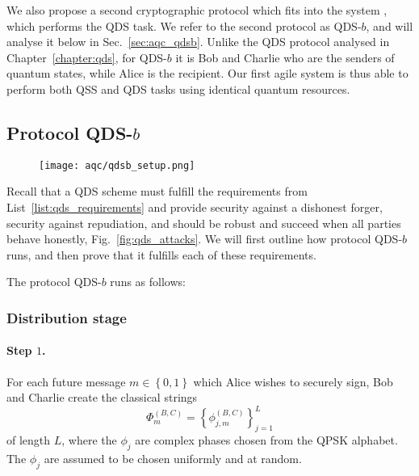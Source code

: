We also propose a second cryptographic protocol which fits into the system \systemB, which performs the QDS task. We refer to the second protocol as QDS-$b$, and will analyse it below in Sec.~\ref{sec:aqc_qdsb}. Unlike the QDS protocol analysed in Chapter~\ref{chapter:qds}, for QDS-$b$ it is Bob and Charlie who are the senders of quantum states, while Alice is the recipient. %
Our first agile system \systemB \; is thus able to perform both QSS and QDS tasks using identical quantum resources. %

\subsection{Protocol QDS-$b$}


\begin{figure}[htp]
\centering
\texttt{[image: aqc/qdsb\_setup.png]}
\caption{\label{fig:qdsb_setup} }
\end{figure}

Recall that a QDS scheme must fulfill the requirements from List~\ref{list:qds_requirements} and provide security against a dishonest forger, security against repudiation, and should be robust and succeed when all parties behave honestly, Fig.~\ref{fig:qds_attacks}. We will first outline how protocol QDS-$b$ runs, and then prove that it fulfills each of these requirements.

The protocol QDS-$b$ runs as follows:

\subsubsection*{Distribution stage}

\paragraph{Step $1$.}
For each future message $m \in \left\{0, 1\right\}$ which Alice wishes to securely sign, Bob and Charlie create the classical strings
\begin{equation}
\Phi_m^{\left(B, C\right)} = \left\{\phi_{j, m}^{\left(B, C\right)}\right\}_{j=1}^L
\end{equation}
of length $L$, where the $\phi_j$ are complex phases chosen from the QPSK alphabet. The $\phi_j$ are assumed to be chosen uniformly and at random.


